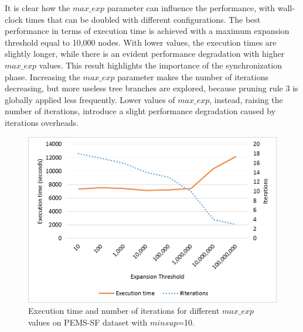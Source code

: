 It is clear how the $max\_exp$ parameter can influence the performance, with wall-clock times that can be doubled with different configurations. The best performance in terms of execution time is achieved with a maximum
expansion threshold equal to 10,000 nodes. With lower values, the execution times are slightly longer, while there is an evident performance degradation with higher $max\_exp$ values.
This result highlights the importance of the synchronization phase.
Increasing the $max\_exp$ parameter makes the number of iterations decreasing,
but more useless tree branches are explored,
because pruning rule 3 is globally applied less frequently.
Lower values of  $max\_exp$, instead, raising the number of iterations, introduce a slight performance
degradation caused by iterations overheads.

\begin{figure}[!t]
\includegraphics[width=5in]{chapters/pampa/immagini_extension/pems_fixed.png}
\caption{Execution time and number of iterations for different $max\_exp$ values on PEMS-SF dataset with $minsup$=10.
}
\label{pems_fixed}
\end{figure}

